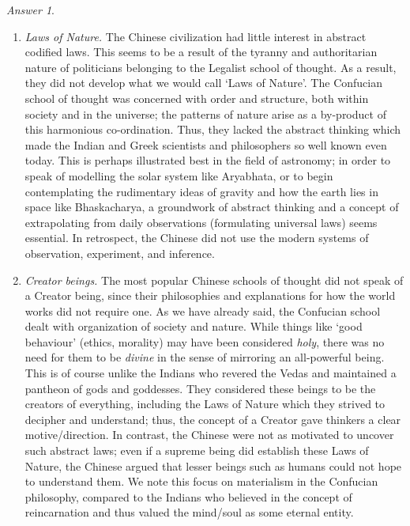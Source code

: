 \documentclass[11pt]{article}
\theoremstyle{remark}
\newtheorem*{answer}{Answer}
\begin{document}
\begin{answer}
\begin{enumerate}
            \item \emph{Laws of Nature.} The Chinese civilization had little interest
            in abstract codified laws. This seems to be a result of the tyranny and
            authoritarian nature of politicians belonging to the Legalist school of
            thought. As a result, they did not develop what we would call `Laws of
            Nature'. The Confucian school of thought was concerned with order and
            structure, both within society and in the universe; the patterns of
            nature arise as a by-product of this harmonious co-ordination. Thus, they
            lacked the abstract thinking which made the Indian and Greek scientists
            and philosophers so well known even today. This is perhaps illustrated
            best in the field of astronomy; in order to speak of modelling the solar
            system like Aryabhata, or to begin contemplating the rudimentary ideas of
            gravity and how the earth lies in space like Bhaskacharya, a groundwork
            of abstract thinking and a concept of extrapolating from daily
            observations (formulating universal laws) seems essential. In retrospect,
            the Chinese did not use the modern systems of observation, experiment,
            and inference.

            \item \emph{Creator beings.} The most popular Chinese schools of thought
            did not speak of a Creator being, since their philosophies and
            explanations for how the world works did not require one. As we have
            already said, the Confucian school dealt with organization of society and
            nature. While things like `good behaviour' (ethics, morality) may have
            been considered \emph{holy}, there was no need for them to be
            \emph{divine} in the sense of mirroring an all-powerful being. This is of
            course unlike the Indians who revered the Vedas and maintained a pantheon
            of gods and goddesses. They considered these beings to be the creators of
            everything, including the Laws of Nature which they strived to decipher
            and understand; thus, the concept of a Creator gave thinkers a clear
            motive/direction. In contrast, the Chinese were not as motivated to
            uncover such abstract laws; even if a supreme being did establish
            these Laws of Nature, the Chinese argued that lesser beings such as
            humans could not hope to understand them. We note this focus on
            materialism in the Confucian philosophy, compared to the Indians who
            believed in the concept of reincarnation and thus valued the mind/soul as
            some eternal entity.


\end{enumerate}
\end{answer}
\end{document}
